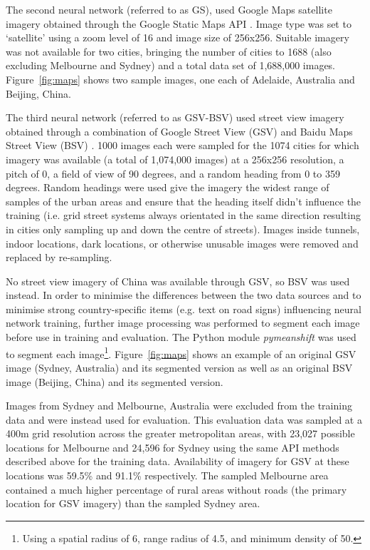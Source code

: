 \documentclass[urbansci,article,submit,moreauthors,pdftex]{Definitions/mdpi}
\begin{document}
The second neural network (referred to as GS), used Google Maps satellite imagery obtained through the Google Static Maps API \citep{GoogleStatic2017}. Image type was set to `satellite' using a zoom level of 16 and image size of 256x256. Suitable imagery was not available for two cities, bringing the number of cities to 1688 (also excluding Melbourne and Sydney) and a total data set of 1,688,000 images. Figure~\ref{fig:maps} shows two sample images, one each of Adelaide, Australia and Beijing, China. 

The third neural network (referred to as GSV-BSV) used street view imagery obtained through a combination of Google Street View (GSV) \citep{GoogleMaps2017b} and Baidu Maps Street View (BSV) \citep{Baidu2017}. 1000 images each were sampled for the 1074 cities for which imagery was available (a total of 1,074,000 images) at a 256x256 resolution, a pitch of 0, a field of view of 90 degrees, and a random heading from 0 to 359 degrees. Random headings were used give the imagery the widest range of samples of the urban areas and ensure that the heading itself didn't influence the training (i.e. grid street systems always orientated in the same direction resulting in cities only sampling up and down the centre of streets). Images inside tunnels, indoor locations, dark locations, or otherwise unusable images were removed and replaced by re-sampling.

No street view imagery of China was available through GSV, so BSV was used instead.  In order to minimise the differences between the two data sources and to minimise strong country-specific items (e.g. text on road signs) influencing neural network training, further image processing was performed to segment each image before use in training and evaluation. The Python module \textit{pymeanshift} \citep{Pymeanshift2017} was used to segment each image\footnote{Using a spatial radius of 6, range radius of 4.5, and minimum density of 50.}. Figure~\ref{fig:maps} shows an example of an original GSV image (Sydney, Australia) and its segmented version as well as an original BSV image (Beijing, China) and its segmented version.


Images from Sydney and Melbourne, Australia were excluded from the training data and were instead used for evaluation. This evaluation data was sampled at a 400m grid resolution across the greater metropolitan areas, with 23,027 possible locations for Melbourne and 24,596 for Sydney using the same API methods described above for the training data. Availability of imagery for GSV at these locations was 59.5\% and 91.1\% respectively. The sampled Melbourne area contained a much higher percentage of rural areas without roads (the primary location for GSV imagery) than the sampled Sydney area.
\end{document}
